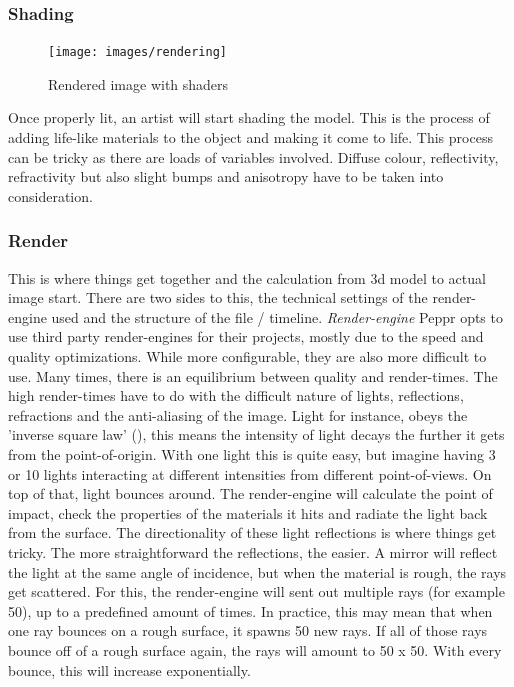 
\subsubsection{Shading}

\begin{figure}
\vspace{-1cm}
\centering
\texttt{[image: images/rendering]}
\caption{Rendered image with shaders}
\label{figure:lighting_rendered}
\end{figure}

Once properly lit, an artist will start shading the model. This is the process of adding life-like materials to the object and making it come to life. This process can be tricky as there are loads of variables involved. Diffuse colour, reflectivity, refractivity but also slight bumps and anisotropy have to be taken into consideration.


\subsubsection{Render}
This is where things get together and the calculation from 3d model to actual image start. There are two sides to this, the technical settings of the render-engine used and the structure of the file / timeline.
\newline
\textit{Render-engine}
\newline
Peppr opts to use third party render-engines for their projects, mostly due to the speed and quality optimizations. While more configurable, they are also more difficult to use. Many times, there is an equilibrium between quality and render-times. The high render-times have to do with the difficult nature of lights, reflections, refractions and the anti-aliasing of the image. Light for instance, obeys the 'inverse square law' (\cite{inverseLightLaw}), this means the intensity of light decays the further it gets from the point-of-origin. With one light this is quite easy, but imagine having 3 or 10 lights interacting at different intensities from different point-of-views. On top of that, light bounces around. The render-engine will calculate the point of impact, check the properties of the materials it hits and radiate the light back from the surface. The directionality of these light reflections is where things get tricky. The more straightforward the reflections, the easier. A mirror will reflect the light at the same angle of incidence, but when the material is rough, the rays get scattered. For this, the render-engine will sent out multiple rays (for example 50), up to a predefined amount of times. In practice, this may mean that when one ray bounces on a rough surface, it spawns 50 new rays. If all of those rays bounce off of a rough surface again, the rays will amount to 50 x 50. With every bounce, this will increase exponentially.

